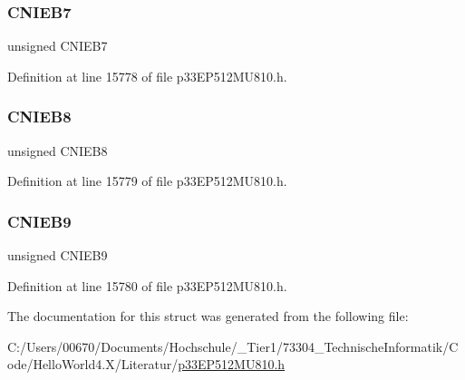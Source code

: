 \subsubsection{\texorpdfstring{C\+N\+I\+E\+B7}{CNIEB7}}
{\footnotesize\ttfamily unsigned C\+N\+I\+E\+B7}



Definition at line 15778 of file p33\+E\+P512\+M\+U810.\+h.

\mbox{\label{structtag_c_n_e_n_b_b_i_t_s_a704e3c28f5ce0980ab1f3576dacda2a8}} 
\subsubsection{\texorpdfstring{C\+N\+I\+E\+B8}{CNIEB8}}
{\footnotesize\ttfamily unsigned C\+N\+I\+E\+B8}



Definition at line 15779 of file p33\+E\+P512\+M\+U810.\+h.

\mbox{\label{structtag_c_n_e_n_b_b_i_t_s_ad4797c430e4d24c055bc467b37855fef}} 
\subsubsection{\texorpdfstring{C\+N\+I\+E\+B9}{CNIEB9}}
{\footnotesize\ttfamily unsigned C\+N\+I\+E\+B9}



Definition at line 15780 of file p33\+E\+P512\+M\+U810.\+h.



The documentation for this struct was generated from the following file\+:\begin{DoxyCompactItemize}
\item 
C\+:/\+Users/00670/\+Documents/\+Hochschule/\+\_\+\+Tier1/73304\+\_\+\+Technische\+Informatik/\+Code/\+Hello\+World4.\+X/\+Literatur/\hyperlink{p33_e_p512_m_u810_8h}{p33\+E\+P512\+M\+U810.\+h}\end{DoxyCompactItemize}
